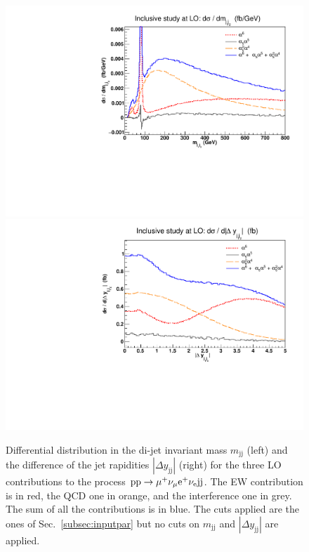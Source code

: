 \documentclass[twocolumn,epjc3]{svjour3} %
\newcommand{\Pj}{\ensuremath{\text{j}}\xspace}
\begin{document}
    \begin{figure}
    \centering
    \includegraphics[scale=0.395]{figures/scanfigures/mjj_full.pdf}
    \includegraphics[scale=0.395]{figures/scanfigures/dyjj_full.pdf}
    \caption{Differential distribution in the di-jet invariant mass $m_{\Pj\Pj}$ (left) and the difference of the jet rapidities $|\Delta y_{\Pj\Pj}|$ (right) for the three LO contributions to the process ${\rm p}{\rm p}\to\mu^+\nu_\mu{\rm e}^+\nu_{\rm e}{\rm j}{\rm j}$.
    The EW contribution is in red, the QCD one in orange, and the interference one in grey.
    The sum of all the contributions is in blue.
    The cuts applied are the ones of Sec.~\protect\ref{subsec:inputpar} but no cuts on $m_{\Pj\Pj}$ and $|\Delta y_{\Pj\Pj}|$ are applied.}
    \label{fig:mjjdyjj_1d}
    \end{figure}
\end{document}
